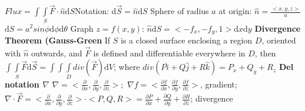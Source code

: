 \documentclass[twoside]{article}
\begin{document}
$Flux = \int\int\limits_S \vec{F} \cdot \hat{n} \mathrm{d}S$\indent   Notation: $\mathrm{d}\vec{S} = \hat{n}\mathrm{d}S$\newline
\indent\indent
Sphere of radius $a$ at origin:\newline
\indent\indent\indent
$\hat{n} = \frac{<x,y,z>}{a}$\newline
\indent\indent\indent
$\mathrm{d}S = a^2 sin\phi \mathrm{d}\phi \mathrm{d}\theta$\newline
\indent\indent
Graph $z = f(x,y)$:\newline
\indent\indent\indent
$\hat{n}\mathrm{d}S =  <-f_x, -f_y, 1> \mathrm{d}x \mathrm{d}y$\newline
\indent
\textbf{Divergence Theorem (Gauss-Green}\newline
\indent\indent
If $S$ is a closed surface enclosing a region $D$, oriented with $\hat{n}$ outwards, and $\vec{F}$ is defined and differentiable\newline
\indent\indent
everywhere in $D$, then \newline\newline
\indent\indent
$\int\int\limits_S \vec{F}\mathrm{d}\vec{S} = \int\int\int\limits_D div(\vec{F}) \mathrm{d}V$; where $div(P\hat{i}+Q\hat{j}+R\hat{k}) = P_x + Q_y + R_z$\newline
\indent
\textbf{Del notation $\nabla$} \newline
\indent\indent
$\nabla = <\frac{\partial}{\partial x}, \frac{\partial}{\partial y}, \frac{\partial}{\partial z}>;$\newline
\indent\indent 
$\nabla f = <\frac{\partial f}{\partial x},\frac{\partial f}{\partial y},\frac{\partial f}{\partial z}>$, gradient; \newline
\indent\indent
$\nabla \cdot \vec{F} = <\frac {\partial}{\partial x}, \frac {\partial}{\partial y}, \frac {\partial}{\partial z}> \cdot <P,Q,R> = \frac {\partial P}{\partial x} + \frac {\partial Q}{\partial y} + \frac {\partial R} {\partial z}$; divergence
\end{document}
